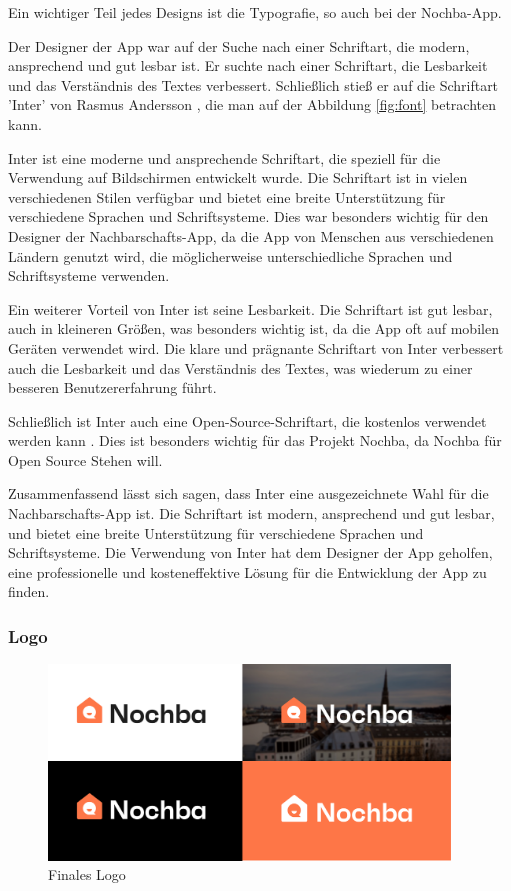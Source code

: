 Ein wichtiger Teil jedes Designs ist die Typografie, so auch bei der Nochba-App.

Der Designer der App war auf der Suche nach einer
Schriftart, die modern, ansprechend und gut lesbar ist. Er
suchte nach einer Schriftart, die Lesbarkeit und das
Verständnis des Textes verbessert. Schließlich stieß er auf
die Schriftart 'Inter' von Rasmus Andersson
\cite{inter-font}, die man auf der Abbildung \ref{fig:font}
betrachten kann.

Inter ist eine moderne und ansprechende Schriftart, die speziell für die Verwendung auf Bildschirmen entwickelt wurde. Die Schriftart ist in vielen verschiedenen Stilen verfügbar und bietet eine breite Unterstützung für verschiedene Sprachen und Schriftsysteme. Dies war besonders wichtig für den Designer der Nachbarschafts-App, da die App von Menschen aus verschiedenen Ländern genutzt wird, die möglicherweise unterschiedliche Sprachen und Schriftsysteme verwenden.

Ein weiterer Vorteil von Inter ist seine Lesbarkeit. Die Schriftart ist gut lesbar, auch in kleineren Größen, was besonders wichtig ist, da die App oft auf mobilen Geräten verwendet wird. Die klare und prägnante Schriftart von Inter verbessert auch die Lesbarkeit und das Verständnis des Textes, was wiederum zu einer besseren Benutzererfahrung führt.

Schließlich ist Inter auch eine Open-Source-Schriftart, die kostenlos verwendet werden kann \cite{inter-font}. Dies ist besonders wichtig für das Projekt Nochba, da Nochba für Open Source Stehen will.

Zusammenfassend lässt sich sagen, dass Inter eine ausgezeichnete Wahl für die Nachbarschafts-App ist. Die Schriftart ist modern, ansprechend und gut lesbar, und bietet eine breite Unterstützung für verschiedene Sprachen und Schriftsysteme. Die Verwendung von Inter hat dem Designer der App geholfen, eine professionelle und kosteneffektive Lösung für die Entwicklung der App zu finden.
\subsubsection{Logo}

\begin{figure}[H]
  \centering
  \includegraphics[width=0.95\textwidth]{pics/final-logo.png}
  \caption{Finales Logo}
  \label{fig:final-logo}
\end{figure}

